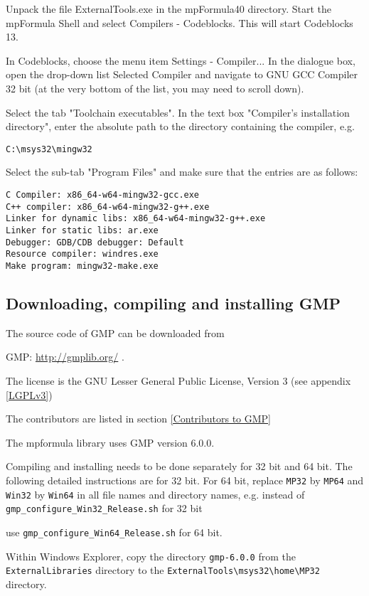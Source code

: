 Unpack the file ExternalTools.exe in the mpFormula40 directory. Start the mpFormula Shell and select Compilers - Codeblocks. This will start Codeblocks 13.

In Codeblocks, choose the menu item Settings - Compiler... In the dialogue box, open the drop-down list Selected Compiler and navigate to GNU GCC Compiler 32 bit (at the very bottom of the list, you may need to scroll down).

Select the tab "Toolchain executables". In the text box "Compiler's installation directory", enter the absolute path to the directory containing the compiler, e.g.
\begin{verbatim}
C:\msys32\mingw32
\end{verbatim}
Select the sub-tab "Program Files" and make sure that the entries are as follows:

\begin{verbatim}
C Compiler: x86_64-w64-mingw32-gcc.exe
C++ compiler: x86_64-w64-mingw32-g++.exe
Linker for dynamic libs: x86_64-w64-mingw32-g++.exe
Linker for static libs: ar.exe
Debugger: GDB/CDB debugger: Default
Resource compiler: windres.exe
Make program: mingw32-make.exe
\end{verbatim}




\newpage
\subsection{Downloading, compiling and installing GMP}
The source code of GMP can be downloaded from

GMP: \href{http://gmplib.org/}{http://gmplib.org/} . 

The license is the GNU Lesser General Public License, Version 3 (see appendix \ref{LGPLv3})

The contributors are listed in section \ref{Contributors to GMP}

The mpformula library uses GMP version 6.0.0.

\vpara
Compiling and installing needs to be done separately for 32 bit and 64 bit. The following detailed instructions are for 32 bit. For 64 bit, replace \verb|MP32| by \verb|MP64| and \verb|Win32| by  \verb|Win64| in all file names and directory names, e.g. instead of \verb|gmp_configure_Win32_Release.sh| for 32 bit

use \verb|gmp_configure_Win64_Release.sh| for 64 bit.

\vpara
Within Windows Explorer, copy the directory \verb|gmp-6.0.0|  from the \verb|ExternalLibraries|
directory to the \verb|ExternalTools\msys32\home\MP32| directory. 

